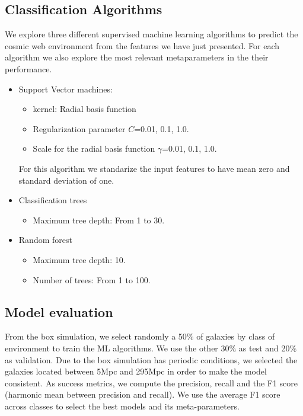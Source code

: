 \documentclass[usenatbib]{mnras}
\begin{document}
\subsection{Classification Algorithms}

We explore three different supervised machine learning algorithms to
predict the cosmic web environment from the features we have just
presented.
For each algorithm we also explore the most relevant metaparameters in
the their performance.

\begin{itemize}
    \item Support Vector machines: 
        \begin{itemize}
            \item kernel: Radial basis function
            \item Regularization parameter $C$=0.01, 0.1, 1.0.
            \item Scale for the radial basis function  $\gamma$=0.01,
              0.1, 1.0.
        \end{itemize}
        For this algorithm we standarize the input features to have
        mean zero and standard deviation of one.
    \item Classification trees
      \begin{itemize}
      \item Maximum tree depth: From 1 to 30.
      \end{itemize}
    \item Random forest
        \begin{itemize}
            \item Maximum tree depth: 10.
            \item Number of trees: From 1 to 100.
        \end{itemize}
\end{itemize}


\subsection{Model evaluation}


From the box simulation, we select randomly a 50$\%$ of galaxies by
class of environment to train the ML algorithms. We use the other
30$\%$ as test and  20$\%$ as validation. Due to the box simulation
has periodic conditions, we selected the galaxies located between 5Mpc
and 295Mpc in order to make the model consistent.   
As success metrics, we compute the precision, recall and the F1 score
(harmonic mean between precision and recall). 
We use the average F1 score across classes to select the best models
and its meta-parameters. 
\end{document}
